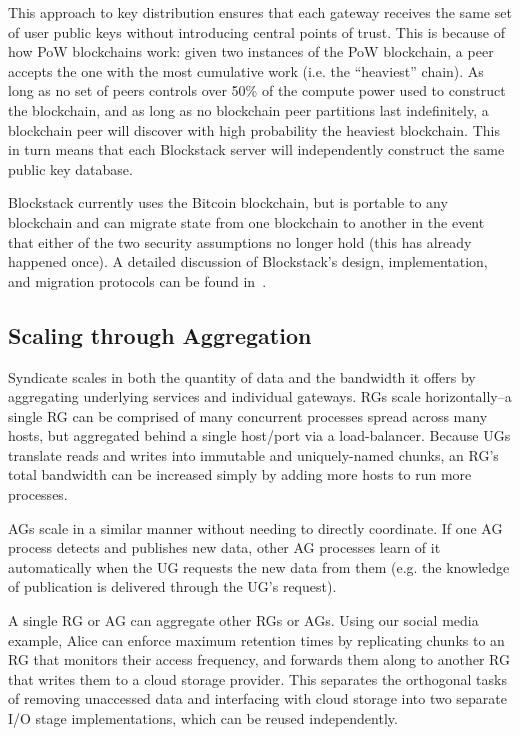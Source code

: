 This approach to key distribution ensures that each gateway receives the same
set of user public keys without introducing central points of trust. This is
because of how PoW blockchains work: given two instances of the PoW blockchain,
a peer accepts the one with the most cumulative work (i.e. the
``heaviest'' chain). As long as no set of peers controls over 50\% of the
compute power used to construct the blockchain, and as long as no blockchain
peer partitions last indefinitely, a blockchain peer will discover with high
probability the heaviest blockchain. This in turn means that each Blockstack
server will independently construct the same public key database.


Blockstack currently uses the Bitcoin blockchain, but is portable to any
blockchain and can migrate state from one blockchain to another in the event
that either of the two security assumptions no longer hold (this has already
happened once). A detailed discussion of Blockstack's design,
implementation, and migration protocols can be found in~\cite{blockstack}.

\subsection{Scaling through Aggregation}

Syndicate scales in both the quantity of data and the bandwidth it offers by
aggregating underlying services and individual gateways. RGs scale
horizontally--a single RG can be comprised of many concurrent processes
spread across many hosts, but aggregated behind a single host/port via a
load-balancer. Because UGs translate reads and writes into immutable and
uniquely-named chunks, an RG's total bandwidth can be increased simply by
adding more hosts to run more processes.

AGs scale in a similar manner without needing to directly coordinate. If one AG
process detects and publishes new data, other AG processes learn of it
automatically when the UG requests the new data from them (e.g. the knowledge of
publication is delivered through the UG's request).

A single RG or AG can aggregate other RGs or AGs. Using our social media
example, Alice can enforce maximum retention times by replicating chunks to an
RG that monitors their access frequency, and forwards them along to another RG
that writes them to a cloud storage provider. This separates the orthogonal
tasks of removing unaccessed data and interfacing with cloud storage into two
separate I/O stage implementations, which can be reused independently.

